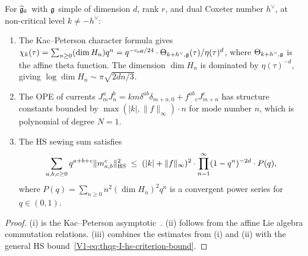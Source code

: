 \begin{proposition}
For $\widehat{\mathfrak{g}}_k$ with $\mathfrak{g}$ simple of dimension $d$, rank $r$, and dual Coxeter number $h^\vee$, at non-critical level $k \neq -h^\vee$:
\begin{enumerate}[label=\textup{(\roman*)}]
\item The Kac--Peterson character formula gives $\chi_k(\tau) = \sum_{n \geq 0} (\dim H_n) q^n = q^{-c_{\text{eff}}/24} \cdot \Theta_{k+h^\vee,\mathfrak{g}}(\tau) / \eta(\tau)^d$, where $\Theta_{k+h^\vee,\mathfrak{g}}$ is the affine theta function. The dimension $\dim H_n$ is dominated by $\eta(\tau)^{-d}$, giving $\log \dim H_n \sim \pi\sqrt{2dn/3}$.
\item The OPE of currents $J^a_m J^b_n = k m \delta^{ab}\delta_{m+n,0} + f^{ab}{}_c J^c_{m+n}$ has structure constants bounded by $\max(|k|, \|f\|_\infty) \cdot n$ for mode number $n$, which is polynomial of degree $N = 1$.
\item The HS sewing sum satisfies
 \begin{equation}%
 \sum_{a,b,c \geq 0} q^{a+b+c} \|m^c_{a,b}\|_{\HS}^2 \;\leq\; (|k| + \|f\|_\infty)^2 \cdot \prod_{n=1}^\infty (1-q^n)^{-2d} \cdot P(q),
 \end{equation}
 where $P(q) = \sum_{n \geq 0} n^2 (\dim H_n)^2 q^n$ is a convergent power series for $q \in (0,1)$.
\end{enumerate}
\end{proposition}

\begin{proof}
(i) is the Kac--Peterson asymptotic~\cite{KP84}. (ii) follows from the affine Lie algebra commutation relations. (iii) combines the estimates from (i) and (ii) with the general HS bound~\eqref{V1-eq:thqg-I-hs-criterion-bound}.
\end{proof}

